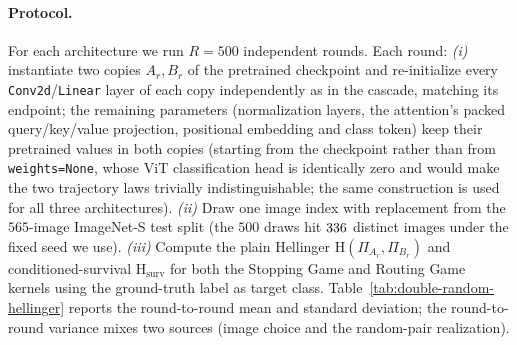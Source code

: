 \documentclass[twoside]{article}
\newcommand{\1}{\mathbf{1}}
\begin{document}
\paragraph{Protocol.}
For each architecture we run $R = 500$ independent rounds.  Each round: \emph{(i)} instantiate two
copies $A_r, B_r$ of the pretrained checkpoint and re-initialize every
\texttt{Conv2d}/\texttt{Linear} layer of each copy independently as in the cascade, matching its
endpoint; the remaining parameters (normalization layers, the attention's packed query/key/value
projection, positional embedding and class token) keep their pretrained values in both copies
(starting from the checkpoint rather than from \texttt{weights=None}, whose ViT classification head
is identically zero and would make the two trajectory laws trivially indistinguishable; the same
construction is used for all three architectures).  \emph{(ii)} Draw one image index with
replacement from the $565$-image ImageNet-S test split (the $500$ draws hit $336$
distinct images under the fixed seed we use).  \emph{(iii)} Compute the plain Hellinger
$\mathrm{H}(\Pi_{A_r}, \Pi_{B_r})$ and conditioned-survival $\mathrm{H}_{\mathrm{surv}}$ for both
the Stopping Game and Routing Game kernels using the ground-truth label as target class.
Table~\ref{tab:double-random-hellinger} reports the round-to-round mean and standard deviation; the
round-to-round variance mixes two sources (image choice and the random-pair realization).

\begin{table}[H]
    \centering
    \small
    
    \caption{Hellinger trajectory distance between two independently random-initialized copies of the
    same architecture, averaged over $R = 500$ rounds (one fresh ImageNet-S test image per round).
    Plain $\mathrm{H}$ concentrates at an architecture-dependent cemetery floor of
    $\drFloorMin$--$\drFloorMax$; conditioned-survival $\mathrm{H}_{\mathrm{surv}}$ saturates at unity.
    The VGG-16 Routing Game cell is the one case in which the plain distance also saturates at
    $1.000$.}
    \label{tab:double-random-hellinger}
\end{table}
\end{document}
